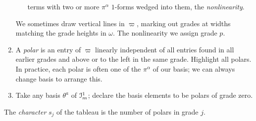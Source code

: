 \begin{enumerate}
\begin{enumerate}
terms with two or more \(\pi^{\alpha}\) \(1\)-forms wedged into them, the \emph{nonlinearity}.
\end{enumerate}
We sometimes draw vertical lines in \(\varpi\), marking out grades at widths matching the grade heights in \(\omega\).
The nonlinearity we assign grade \(p\).
\item
A \emph{polar} is an entry of \(\varpi\) linearly independent of all entries found in all earlier grades and above or to the left in the same grade.
Highlight all polars.
In practice, each polar is often one of the \(\pi^{\alpha}\) of our basis; we can always change basis to arrange this.
\item
Take any basis \(\theta^a\) of \(\mathcal{I}^1_m\); declare the basis elements to be polars of grade zero.
\end{enumerate}
The \emph{character} \(s_j\) of the tableau is the number of polars in grade \(j\).
